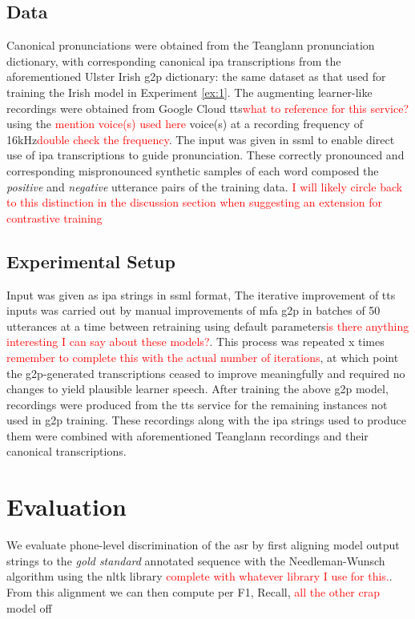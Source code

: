 \documentclass[thesis]{cluu}
\newcommand{\todo}[1]{\textcolor{red}{#1}}
\begin{document}
\subsection{Data} 
Canonical pronunciations were obtained from the Teanglann pronunciation dictionary, with corresponding canonical \gls{ipa} transcriptions from the aforementioned Ulster Irish \gls{g2p} dictionary: the same dataset as that used for training the Irish model in Experiment \ref{ex:1}. The augmenting learner-like recordings were obtained from Google Cloud \acrlong{tts}\todo{what to reference for this service?} using the \todo{mention voice(s) used here} voice(s) at a recording frequency of 16kHz\todo{double check the frequency}. The input was given in \gls{ssml} to enable direct use of \gls{ipa} transcriptions to guide pronunciation. These correctly pronounced and corresponding mispronounced synthetic samples of each word composed the \textit{positive} and \textit{negative} utterance pairs of the training data. \todo{I will likely circle back to this distinction in the discussion section when suggesting an extension for contrastive training}

\subsection{Experimental Setup}
Input was given as \gls{ipa} strings in \gls{ssml} format, 
The iterative improvement of \gls{tts} inputs was carried out by manual improvements of \gls{mfa} \gls{g2p} \parencite{mcauliffeMontrealForcedAligner2017} in batches of 50 utterances at a time between retraining using default parameters\todo{is there anything interesting I can say about these models?}. This process was repeated x times \todo{remember to complete this with the actual number of iterations}, at which point the \gls{g2p}-generated transcriptions ceased to improve meaningfully and required no changes to yield plausible learner speech.
After training the above \gls{g2p} model, recordings were produced from the \gls{tts} service for the remaining instances not used in \gls{g2p} training. These recordings along with the \gls{ipa} strings used to produce them were combined with aforementioned Teanglann recordings and their canonical transcriptions.

\section{Evaluation}
We evaluate phone-level discrimination of the \gls{asr} by first aligning model output strings to the \textit{gold standard} annotated sequence with the Needleman-Wunsch algorithm \parencite{needlemanGeneralMethodApplicable1970} using the \gls{nltk} library \todo{complete with whatever library I use for this.}. From this alignment we can then compute \gls{per} F1, Recall, \todo{all the other crap} 
model off \parencite{leungCNNRNNCTCBasedEndtoend2019}
\end{document}
